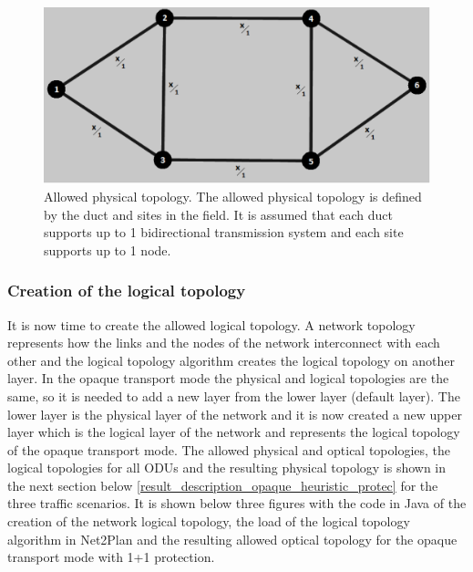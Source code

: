 \begin{figure}[H]
\centering
\includegraphics[width=12cm]{sdf/heuristic/opaque_protection/figures/allowed_physical}
\caption{Allowed physical topology. The allowed physical topology is defined by the duct and sites in the field. It is assumed that each duct supports up to 1 bidirectional transmission system and each site supports up to 1 node.}
\label{allowed_physical_surv_ref_low_heuristic}
\end{figure}

\subsubsection{Creation of the logical topology}

\vspace{11pt}
It is now time to create the allowed logical topology. A network topology represents how the links and the nodes of the network interconnect with each other and the logical topology algorithm creates the logical topology on another layer. In the opaque transport mode the physical and logical topologies are the same, so it is needed to add a new layer from the lower layer (default layer). The lower layer is the physical layer of the network and it is now created a new upper layer which is the logical layer of the network and represents the logical topology of the opaque transport mode. The allowed physical and optical topologies, the logical topologies for all ODUs and the resulting physical topology is shown in the next section below \ref{result_description_opaque_heuristic_protec} for the three traffic scenarios. It is shown below three figures with the code in Java of the creation of the network logical topology, the load of the logical topology algorithm in Net2Plan and the resulting allowed optical topology for the opaque transport mode with 1+1 protection.

